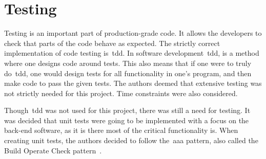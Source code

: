 \section{Testing}\label{sec:testing}

Testing is an important part of production-grade code.
It allows the developers to check that parts of the code behave as expected.
The strictly correct implementation of code testing is~\acrfull{tdd}.
In software development~\acrshort{tdd}, is a method where one designs code around tests.
This also means that if one were to truly do~\acrshort{tdd}, one would design tests for all functionality
in one's program, and then make code to pass the given tests.
The authors deemed that extensive testing was not strictly needed for this project.
Time constraints were also considered.

Though~\acrshort{tdd} was not used for this project, there was still a need for testing.
It was decided that unit tests were going to be implemented with a focus on the back-end software, as
it is there most of the critical functionality is.
When creating unit tests, the authors decided to follow the~\acrfull{aaa} pattern, also called the Build Operate
Check pattern~\cite{clean-code}.




